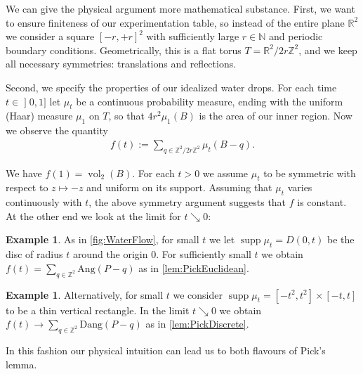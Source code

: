 \documentclass[a4paper]{amsart}
\numberwithin{equation}{section}
\theoremstyle{plain}
\theoremstyle{definition}
\newtheorem{example}[theorem]{Example}
\newcommand{\N}{\mathbb{N}}
\newcommand{\Z}{\mathbb{Z}}
\newcommand{\R}{\mathbb{R}}
\newcommand{\ei}[2]{\mathopen] #1, #2 \mathclose]}
\DeclareMathOperator{\vol}{vol}
\DeclareMathOperator{\supp}{supp}
\newcommand{\Ang}{\mathrm{Ang}}
\newcommand{\Dang}{\mathrm{Dang}}
\begin{document}
We can give the physical argument more mathematical substance.
%
First, we want to ensure finiteness of our experimentation table,
so instead of the entire plane $\R^2$ we consider a square $[-r,+r]^2$
with sufficiently large $r \in \N$ and periodic boundary conditions.
Geometrically, this is a flat torus $T = \R^2 / 2r\Z^2$,
and we keep all necessary symmetries: translations and reflections.

Second, we specify the properties of our idealized water drops.
For each time $t \in \ei{0}{1}$ let $\mu_t$ be a continuous probability measure,
ending with the uniform (Haar) measure $\mu_1$ on $T$,
so that $4 r^2 \mu_1(B)$ is the area of our inner region. 
Now we observe the quantity 
\begin{align*}
  f(t) := \sum_{q \in \Z^2/2r\Z^2} \mu_t(B-q) .
\end{align*}

We have $f(1) = \vol_2(B)$.
For each $t > 0$ we assume $\mu_t$ to be symmetric
with respect to $z \mapsto -z$ and uniform on its support.
Assuming that $\mu_t$ varies continuously with $t$,
the above symmetry argument suggests that $f$ is constant.
At the other end we look at the limit for $t \searrow 0$:

\begin{example}
  As in \autoref{fig:WaterFlow}, for small $t$ %
  we let $\supp \mu_t = D(0,t)$ be the disc of radius $t$ around the origin $0$.
  For sufficiently small $t$ we obtain $f(t) = \sum_{q \in \Z^2} \Ang(P-q)$
  as in \ref{lem:PickEuclidean}.

\end{example}

\begin{example}
  Alternatively, for small $t$ %
  we consider $\supp \mu_t = [-t^2,t^2] \times [-t,t]$
  to be a thin vertical rectangle.
  In the limit $t \searrow 0$ we obtain
  $f(t) \to \sum_{q \in \Z^2} \Dang(P-q)$
  as in \ref{lem:PickDiscrete}.
  
\end{example}

In this fashion our physical intuition can lead us to both flavours of Pick's lemma.
\end{document}
